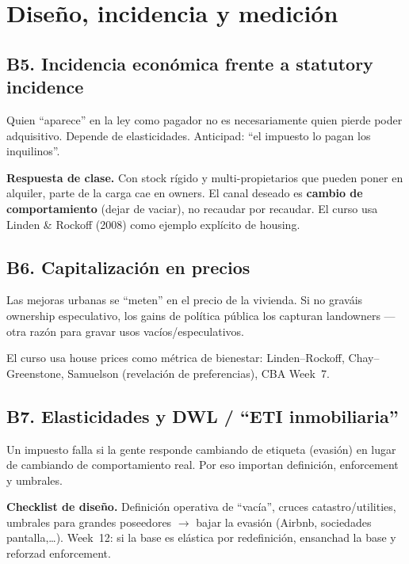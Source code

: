 \documentclass[11pt,a4paper]{report}
\begin{document}
\section{Dise\~no, incidencia y medici\'on}

\subsection{B5. Incidencia econ\'omica frente a statutory incidence}

\begin{intuicion}
Quien ``aparece'' en la ley como pagador no es necesariamente quien pierde
poder adquisitivo. Depende de elasticidades. Anticipad: ``el impuesto lo pagan
los inquilinos''.
\end{intuicion}

\textbf{Respuesta de clase.} Con stock r\'igido y multi-propietarios que pueden
poner en alquiler, parte de la carga cae en owners. El canal deseado es
\textbf{cambio de comportamiento} (dejar de vaciar), no recaudar por recaudar.
El curso usa Linden \& Rockoff (2008) como ejemplo expl\'icito de housing.

\subsection{B6. Capitalizaci\'on en precios}

\begin{intuicion}
Las mejoras urbanas se ``meten'' en el precio de la vivienda. Si no grav\'ais
ownership especulativo, los gains de pol\'itica p\'ublica los capturan
landowners --- otra raz\'on para gravar usos vac\'ios/especulativos.
\end{intuicion}

El curso usa house prices como m\'etrica de bienestar: Linden--Rockoff,
Chay--Greenstone, Samuelson (revelaci\'on de preferencias), CBA Week~7.

\subsection{B7. Elasticidades y DWL / ``ETI inmobiliaria''}

\begin{intuicion}
Un impuesto falla si la gente responde cambiando de etiqueta (evasión) en
lugar de cambiando de comportamiento real. Por eso importan definici\'on,
enforcement y umbrales.
\end{intuicion}

\textbf{Checklist de dise\~no.} Definici\'on operativa de ``vac\'ia'', cruces
catastro/utilities, umbrales para grandes poseedores $\rightarrow$ bajar la
evasión (Airbnb, sociedades pantalla,\ldots). Week~12: si la base es el\'astica
por redefinici\'on, ensanchad la base y reforzad enforcement.
\end{document}
